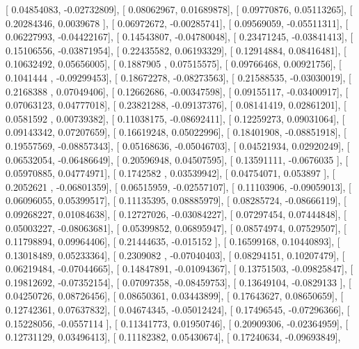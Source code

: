 \documentclass{article}
\begin{document}
       [ 0.04854083, -0.02732809],
       [ 0.08062967,  0.01689878],
       [ 0.09770876,  0.05113265],
       [ 0.20284346,  0.0039678 ],
       [ 0.06972672, -0.00285741],
       [ 0.09569059, -0.05511311],
       [ 0.06227993, -0.04422167],
       [ 0.14543807, -0.04780048],
       [ 0.23471245, -0.03841413],
       [ 0.15106556, -0.03871954],
       [ 0.22435582,  0.06193329],
       [ 0.12914884,  0.08416481],
       [ 0.10632492,  0.05656005],
       [ 0.1887905 ,  0.07515575],
       [ 0.09766468,  0.00921756],
       [ 0.1041444 , -0.09299453],
       [ 0.18672278, -0.08273563],
       [ 0.21588535, -0.03030019],
       [ 0.2168388 ,  0.07049406],
       [ 0.12662686, -0.00347598],
       [ 0.09155117, -0.03400917],
       [ 0.07063123,  0.04777018],
       [ 0.23821288, -0.09137376],
       [ 0.08141419,  0.02861201],
       [ 0.0581592 ,  0.00739382],
       [ 0.11038175, -0.08692411],
       [ 0.12259273,  0.09031064],
       [ 0.09143342,  0.07207659],
       [ 0.16619248,  0.05022996],
       [ 0.18401908, -0.08851918],
       [ 0.19557569, -0.08857343],
       [ 0.05168636, -0.05046703],
       [ 0.04521934,  0.02920249],
       [ 0.06532054, -0.06486649],
       [ 0.20596948,  0.04507595],
       [ 0.13591111, -0.0676035 ],
       [ 0.05970885,  0.04774971],
       [ 0.1742582 ,  0.03539942],
       [ 0.04754071,  0.053897  ],
       [ 0.2052621 , -0.06801359],
       [ 0.06515959, -0.02557107],
       [ 0.11103906, -0.09059013],
       [ 0.06096055,  0.05399517],
       [ 0.11135395,  0.08885979],
       [ 0.08285724, -0.08666119],
       [ 0.09268227,  0.01084638],
       [ 0.12727026, -0.03084227],
       [ 0.07297454,  0.07444848],
       [ 0.05003227, -0.08063681],
       [ 0.05399852,  0.06895947],
       [ 0.08574974,  0.07529507],
       [ 0.11798894,  0.09964406],
       [ 0.21444635, -0.015152  ],
       [ 0.16599168,  0.10440893],
       [ 0.13018489,  0.05233364],
       [ 0.2309082 , -0.07040403],
       [ 0.08294151,  0.10207479],
       [ 0.06219484, -0.07044665],
       [ 0.14847891, -0.01094367],
       [ 0.13751503, -0.09825847],
       [ 0.19812692, -0.07352154],
       [ 0.07097358, -0.08459753],
       [ 0.13649104, -0.0829133 ],
       [ 0.04250726,  0.08726456],
       [ 0.08650361,  0.03443899],
       [ 0.17643627,  0.08650659],
       [ 0.12742361,  0.07637832],
       [ 0.04674345, -0.05012424],
       [ 0.17496545, -0.07296366],
       [ 0.15228056, -0.0557114 ],
       [ 0.11341773,  0.01950746],
       [ 0.20909306, -0.02364959],
       [ 0.12731129,  0.03496413],
       [ 0.11182382,  0.05430674],
       [ 0.17240634, -0.09693849],
\end{document}
